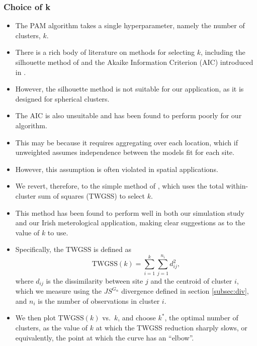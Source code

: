 \documentclass{article}
\numberwithin{equation}{section}
\begin{document}
\subsubsection{Choice of k} \label{subsubsec:choose_k}

\begin{itemize}
  \item The PAM algorithm takes a single hyperparameter, namely the number of clusters, $k$.
  \item There is a rich body of literature on methods for selecting $k$, including the silhouette method of \citep{Rousseeuw1987} and the Akaike Information Criterion (AIC) introduced in \citep{Akaike1974}.
  \item However, the silhouette method is not suitable for our application, as it is designed for spherical clusters. 
  \item The AIC is also unsuitable and has been found to perform poorly for our algorithm.
  \item This may be because it requires aggregating over each location, which if unweighted assumes independence between the models fit for each site.
  \item However, this assumption is often violated in spatial applications.
  \item We revert, therefore, to the simple method of \citet{Thorndike1953-ie}, which uses the total within-cluster sum of squares (TWGSS) to select $k$. 
  \item This method has been found to perform well in both our simulation study and our Irish meterological application, making clear suggestions as to the value of $k$ to use. 
  \item Specifically, the TWGSS is defined as
    \begin{equation} \label{eq:twgss}
      \mathrm{TWGSS}(k) = \sum_{i=1}^{k} \sum_{j=1}^{n_i} d_{ij}^2,
    \end{equation}
    where $d_{ij}$ is the dissimilarity between site $j$ and the centroid of cluster $i$, which we measure using the $JS^{G_{\alpha}}$ divergence defined in section \ref{subsec:div}, and $n_i$ is the number of observations in cluster $i$.
  \item We then plot $\mathrm{TWGSS}(k)$ vs.\ $k$, and choose $k^*$, the optimal number of clusters, as the value of $k$ at which the TWGSS reduction sharply slows, or equivalently, the point at which the curve has an ``elbow''.
\end{itemize}
\end{document}
